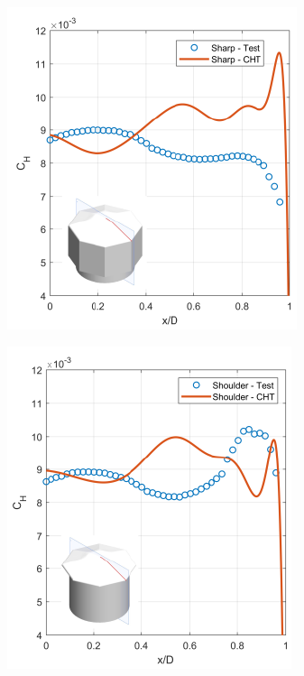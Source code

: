 \begin{figure}[ht]
    \centering
    \begin{subfigure}{0.24\textwidth}
        \includegraphics[width=\textwidth]{Images/2. Background/HATHOR/a.png}
        \caption{}
        \label{subfig:a}
    \end{subfigure}
    \hfill
    \begin{subfigure}{0.24\textwidth}
        \includegraphics[width=\textwidth]{Images/2. Background/HATHOR/b.png}

\end{subfigure}
\end{figure}
